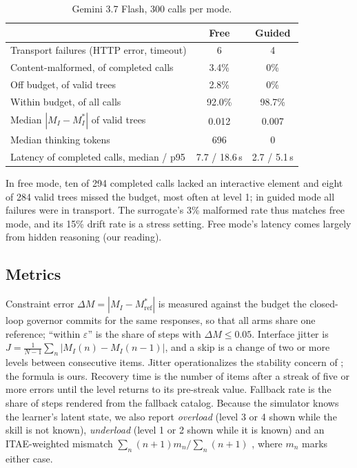 \documentclass[conference]{IEEEtran}
\begin{document}
\begin{table}[t]
\centering
\caption{Gemini 3.7 Flash, 300 calls per mode.}
\label{tab:gemini}
\begin{tabular}{lcc}
\toprule
 & Free & Guided\\
\midrule
Transport failures (HTTP error, timeout) & 6 & 4\\
Content-malformed, of completed calls & 3.4\% & 0\%\\
Off budget, of valid trees & 2.8\% & 0\%\\
Within budget, of all calls & 92.0\% & 98.7\%\\
Median $|M_I-M_I^*|$ of valid trees & 0.012 & 0.007\\
Median thinking tokens & 696 & 0\\
Latency of completed calls, median / p95 & 7.7 / 18.6\,s & 2.7 / 5.1\,s\\
\bottomrule
\end{tabular}
\end{table}

In free mode, ten of 294 completed calls lacked an interactive element
and eight of 284 valid trees missed the budget, most often at level 1; in
guided mode all failures were in transport. The surrogate's 3\% malformed
rate thus matches free mode, and its 15\% drift rate is a stress setting.
Free mode's latency comes largely from hidden reasoning (our reading).

\subsection{Metrics}
Constraint error $\Delta M=|M_I-M^*_{\mathrm{ref}}|$ is measured against the
budget the closed-loop governor commits for the same responses, so that all
arms share one reference; ``within $\varepsilon$'' is the share of steps with
$\Delta M\le 0.05$. Interface jitter is
$J=\frac{1}{N-1}\sum_n|M_I(n)-M_I(n-1)|$, and a skip is a change of two or
more levels between consecutive items. Jitter operationalizes the
stability concern of \cite{gajos2008predictability}; the formula is ours.
Recovery time is the number of items after a streak of five or more errors
until the level returns to its pre-streak value. Fallback rate is the share
of steps rendered from the fallback catalog. Because the simulator knows the
learner's latent state, we also report \emph{overload} (level 3 or 4 shown
while the skill is not known), \emph{underload} (level 1 or 2 shown while it
is known) and an ITAE-weighted mismatch $\sum_n (n{+}1)m_n/\sum_n(n{+}1)$
\cite{graham1953itae}, where $m_n$ marks either case.
\end{document}
